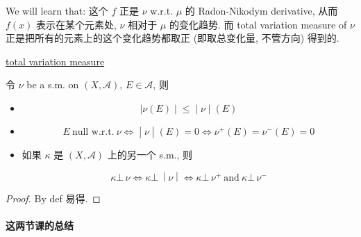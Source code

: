 \documentclass{qlnotes-export}
\begin{document}
We will learn that: 这个 \(f\) 正是 \(\nu\) w.r.t. \(\mu\) 的 Radon-Nikodym derivative, 从而 \(f(x)\) 表示在某个元素处, \(\nu\) 相对于 \(\mu\) 的变化趋势. 而 total variation measure of \(\nu\) 正是把所有的元素上的这个变化趋势都取正 (即取总变化量, 不管方向) 得到的.

\begin{lemma}{\href{https://qiulinfan.github.io/notes/math/measure-theory/\#kn-total-variation-measure}{total
variation measure}}

令 \(\nu\) be a s.m. on \((X,\mathcal{A})\), \(E \in \mathcal{A}\), 则

\begin{itemize}
\item
  \[\left. |\nu(E) \middle| \leq \middle| \nu \middle| (E) \right.\]
\item
  \[\left. E\ \text{null w.r.t.}\ \nu\Leftrightarrow \middle| \nu \middle| (E) = 0\Leftrightarrow\nu^{+}(E) = \nu^{-}(E) = 0 \right.\]
\item
  如果 \(\kappa\) 是 \((X,\mathcal{A})\) 上的另一个 s.m., 则

  \[\left. \kappa\bot\,\nu\Leftrightarrow\kappa\bot\, \middle| \nu \middle| \Leftrightarrow\kappa\bot\,\nu^{+}\ \text{and}\ \kappa\bot\,\nu^{-} \right.\]
\end{itemize}

\end{lemma}

\begin{proof}

By def 易得.

\end{proof}

\paragraph{这两节课的总结}\label{ux8fd9ux4e24ux8282ux8bfeux7684ux603bux7ed3}
\end{document}

